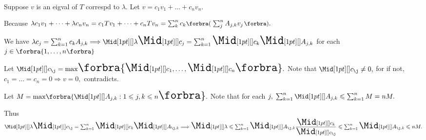 \documentclass[a4paper, 11pt, UTF8]{article}
\begin{document}
\begin{large}
\par\quad
Suppose $v$ is an eigval of $T$ correspd to $\lambda.$ Let $v=c_1v_1+\dots+c_nv_n.$\vspace{2pt}\par\quad
Because $\lambda c_1v_1+\dots+\lambda c_nv_n=c_1Tv_1+\dots+c_nTv_n=\sum_{k}^nc_k\BigPar{\sum_{j}^n A_{j,k}v_j}.$\vspace{3pt}\par\quad
We have $\lambda c_j=\sum_{k=1}^n c_kA_{j,k}\Longrightarrow\aMid{\lambda}\aMid{c_j}=\sum_{k=1}^n\aMid{c_k}\aMid{A_{j,k}}$ for each $j\in\Bra{1,\dots,n}$\vspace{4pt}\par\quad
Let $\aMid{c_{\j}}=\max\!\Bra{\aMid{c_1},\dots,\aMid{c_n}}.$ Note that $\aMid{c_{\j}}\neq 0,$ for if not, $c_1=\dots=c_n=0\Rightarrow v=0,$ contradicts.\vspace{6pt}\par\quad
Let $M=\max\!\Bra{\aMid{A_{j,k}}:1\leqslant j,k\leqslant n}.$ Note that for each $j,\;\sum_{k=1}^n\aMid{A_{j,k}}\leqslant\sum_{k=1}^nM=nM.$\vspace{4pt}\par\quad
Thus $\aMid{\lambda}\aMid{c_{\j}}=\sum_{k=1}^n\aMid{c_k}\aMid{A_{{\j},k}}\Longrightarrow\aMid{\lambda}\leqslant\sum_{k=1}^n\aMid{A_{{\j},k}}\displaystyle\frac{\aMid{c_k}}{\aMid{c_{\j}}}\textstyle\leqslant\sum_{k=1}^n\aMid{A_{{\j},k}}\leqslant nM.$\PfEnd\vspace{2pt}
\SepLine\pagebreak


\end{large}
\end{document}
